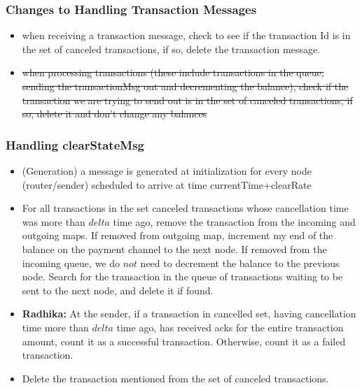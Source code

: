 \documentclass[a4paper]{article}
\newcommand{\radhika}[1]{{\color{red} \textbf{Radhika:} {#1}}}
\begin{document}
\subsubsection{ Changes to Handling Transaction Messages}
    \begin{itemize}
        \item when receiving a transaction message, check to see if the transaction Id is in the set of canceled transactions, if so, delete the transaction message.
        \item \sout{ when processing transactions (these include transactions in the queue, sending the transactionMsg out and decrementing the balance), check if the transaction we are trying to send out is in the set of canceled transactions, if so, delete it and don’t change any balances}

    \end{itemize}
\subsubsection{ Handling clearStateMsg}
    \begin{itemize}
        \item (Generation) a message is generated at initialization for every node (router/sender) scheduled to arrive at time  currentTime+clearRate
        \item For all transactions in the set canceled transactions whose cancellation time  was more than $delta$ time ago, remove the transaction from the incoming and outgoing maps. If removed from outgoing map, increment my end of the balance on the payment channel to the next node. If removed from the incoming queue, we do $not$ need to decrement the balance to the previous node. Search for the transaction in the queue of transactions waiting to be sent to the next node, and delete it if found.
        \item \radhika{At the sender, if a transaction in cancelled set, having cancellation time more than $delta$ time ago, has received acks for the entire transaction amount, count it as a successful transaction. Otherwise, count it as a failed transaction.} 
        \item Delete the transaction mentioned from the set of canceled transactions. 
    \end{itemize}




\end{document}
